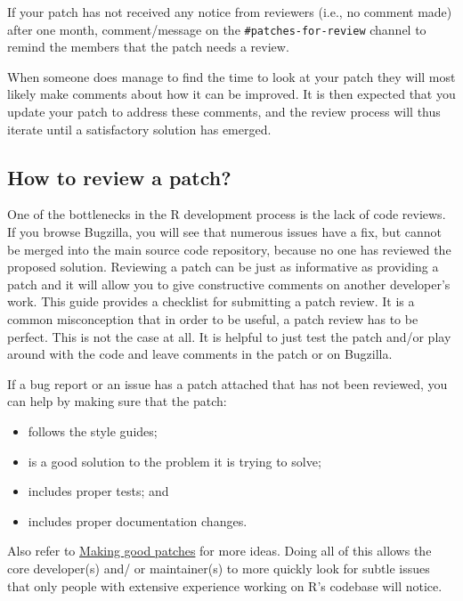 \documentclass[
]{book}
\begin{document}
If your patch has not received any notice from reviewers (i.e., no comment made) after one month, comment/message on the \texttt{\#patches-for-review} channel to remind the members that the patch needs a review.

When someone does manage to find the time to look at your patch they will most likely make comments about how it can be improved. It is then expected that you update your patch to address these comments, and the review process will thus iterate until a satisfactory solution has emerged.

\hypertarget{how-to-review-a-patch}{%
\subsection{How to review a patch?}\label{how-to-review-a-patch}}

One of the bottlenecks in the R development process is the lack of code reviews. If you browse Bugzilla, you will see that numerous issues have a fix, but cannot be merged into the main source code repository, because no one has reviewed the proposed solution. Reviewing a patch can be just as informative as providing a patch and it will allow you to give constructive comments on another developer's work. This guide provides a checklist for submitting a patch review. It is a common misconception that in order to be useful, a patch review has to be perfect. This is not the case at all. It is helpful to just test the patch and/or play around with the code and leave comments in the patch or on Bugzilla.

If a bug report or an issue has a patch attached that has not been reviewed, you can help by making sure that the patch:

\begin{itemize}
\item
  follows the style guides;
\item
  is a good solution to the problem it is trying to solve;
\item
  includes proper tests; and
\item
  includes proper documentation changes.
\end{itemize}

Also refer to \protect\hyperlink{GoodPatches}{Making good patches} for more ideas. Doing all of this allows the core developer(s) and/ or maintainer(s) to more quickly look for subtle issues that only people with extensive experience working on R's codebase will notice.
\end{document}
